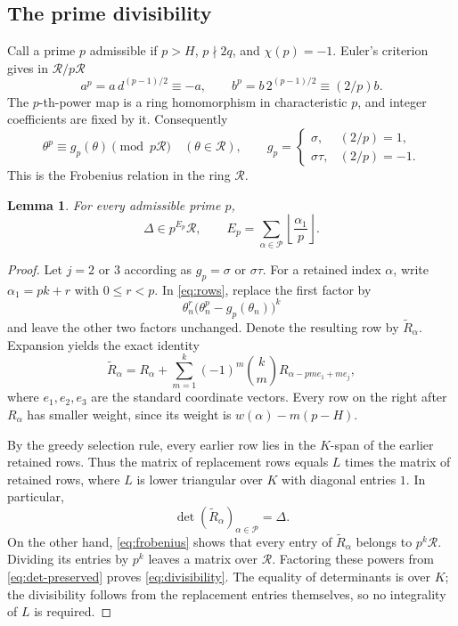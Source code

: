 \documentclass[11pt,a4paper]{amsart}
\newtheorem{lemma}[theorem]{Lemma}
\theoremstyle{remark}
\newcommand{\cR}{\mathcal R}
\newcommand{\cP}{\mathcal P}
\numberwithin{equation}{section}
\begin{document}
\subsection*{The prime divisibility}
Call a prime $p$ admissible if
$p>H$, $p\nmid2q$, and $\chi(p)=-1$. Euler's criterion gives
in $\cR/p\cR$
\[
 a^p=a\,d^{(p-1)/2}\equiv-a,
 \qquad b^p=b\,2^{(p-1)/2}\equiv(2/p)b.
\]
The $p$-th-power map is a ring homomorphism in characteristic $p$,
and integer coefficients are fixed by it. Consequently
\begin{equation}\label{eq:frobenius}
 \theta^p\equiv g_p(\theta)\pmod{p\cR}
 \quad(\theta\in\cR),\qquad
 g_p=\begin{cases}\sigma,&(2/p)=1,\\
                   \sigma\tau,&(2/p)=-1.
       \end{cases}
\end{equation}
This is the Frobenius relation in the ring $\cR$.

\begin{lemma}\label{lem:divisibility}
For every admissible prime $p$,
\begin{equation}\label{eq:divisibility}
 \Delta\in p^{E_p}\cR,
 \qquad E_p=\sum_{\alpha\in\cP}\left\lfloor\frac{\alpha_1}{p}\right\rfloor.
\end{equation}
\end{lemma}

\begin{proof}
Let $j=2$ or $3$ according as $g_p=\sigma$ or $\sigma\tau$.
For a retained index $\alpha$, write $\alpha_1=pk+r$ with
$0\le r<p$. In \eqref{eq:rows}, replace the first factor by
\[
 \theta_n^r\bigl(\theta_n^p-g_p(\theta_n)\bigr)^k
\]
and leave the other two factors unchanged. Denote the resulting row
by $\widetilde R_\alpha$. Expansion yields the exact identity
\begin{equation}\label{eq:replacement}
 \widetilde R_\alpha
 =R_\alpha+\sum_{m=1}^k(-1)^m\binom{k}{m}
                       R_{\alpha-pm e_1+me_j},
\end{equation}
where $e_1,e_2,e_3$ are the standard coordinate vectors.
Every row on the right after $R_\alpha$ has smaller weight, since
its weight is $w(\alpha)-m(p-H)$.

By the greedy selection rule, every earlier row lies in the
$K$-span of the earlier retained rows. Thus the matrix of replacement
rows equals $L$ times the matrix of retained rows, where $L$ is lower
triangular over $K$ with diagonal entries $1$. In particular,
\begin{equation}\label{eq:det-preserved}
 \det(\widetilde R_\alpha)_{\alpha\in\cP}=\Delta.
\end{equation}
On the other hand, \eqref{eq:frobenius} shows that every entry of
$\widetilde R_\alpha$ belongs to $p^k\cR$. Dividing its entries
by $p^k$ leaves a matrix over $\cR$. Factoring these powers from
\eqref{eq:det-preserved} proves \eqref{eq:divisibility}.
The equality of determinants is over $K$; the divisibility follows
from the replacement entries themselves, so no integrality of $L$
is required.
\end{proof}
\end{document}
